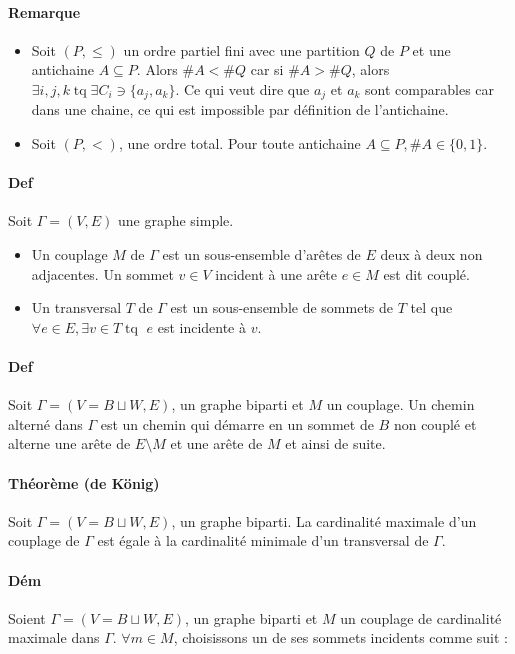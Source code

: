 \documentclass{article}
\newenvironment{lst}
	{\begin{minipage}[t]{.9\linewidth}\begin{itemize}}
	{\end{itemize}\end{minipage}}
\DeclareMathOperator{\tq}{\text{ tq }}
\begin{document}
			\paragraph{Remarque}
				\begin{lst}
					\item Soit $(P, \leq)$ un ordre partiel fini avec une partition $Q$ de $P$ et une antichaine $A \subseteq P$. Alors $\#A < \#Q$
						  car si $\#A > \#Q$, alors $\exists i, j, k \tq \exists C_i \ni \{a_j, a_k\}$. Ce qui veut dire que $a_j$ et $a_k$ sont
						  comparables car dans une chaine, ce qui est impossible par définition de l'antichaine.
					\item Soit $(P, <)$, une ordre total. Pour toute antichaine $A \subseteq P, \#A \in \{0, 1\}$.
				\end{lst}

			\paragraph{Def} Soit $\Gamma = (V, E)$ une graphe simple.
				\begin{itemize}
					\item Un couplage $M$ de $\Gamma$ est un sous-ensemble d'arêtes de $E$ deux à deux non adjacentes. Un sommet
						  $v \in V$ incident à une arête $e \in M$ est dit couplé.
					\item Un transversal $T$ de $\Gamma$ est un sous-ensemble de sommets de $T$ tel que $\forall e \in E, \exists v \in T \tq $
						  $e$ est incidente à $v$.
				\end{itemize}

			\paragraph{Def} Soit $\Gamma = (V = B \sqcup W, E)$, un graphe biparti et $M$ un couplage. Un chemin alterné dans $\Gamma$ est un chemin
			qui démarre en un sommet de $B$ non couplé et alterne une arête de $E \setminus M$ et une arête de $M$ et ainsi de suite.

			\paragraph{Théorème (de König)} Soit $\Gamma = (V = B \sqcup W, E)$, un graphe biparti. La cardinalité maximale d'un couplage de $\Gamma$
			est égale à la cardinalité minimale d'un transversal de $\Gamma$.

			\paragraph{Dém} Soient $\Gamma = (V = B \sqcup W, E)$, un graphe biparti et $M$ un couplage de cardinalité maximale dans $\Gamma$.
			$\forall m \in M$, choisissons un de ses sommets incidents comme suit :
\end{document}
